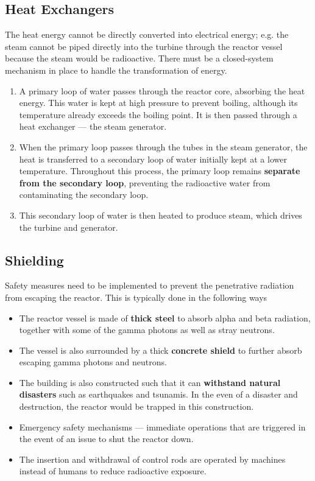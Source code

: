 \documentclass[a4paper,12pt]{article}
\begin{document}
\subsection{Heat Exchangers}

The heat energy cannot be directly converted into electrical energy; e.g. the steam cannot be piped directly into the turbine through the reactor vessel because the steam would be radioactive. There must be a closed-system mechanism in place to handle the transformation of energy.
\begin{enumerate}
  \item A primary loop of water passes through the reactor core, absorbing the heat energy. This water is kept at high pressure to prevent boiling, although its temperature already exceeds the boiling point. It is then passed through a heat exchanger --- the steam generator.
  \item When the primary loop passes through the tubes in the steam generator, the heat is transferred to a secondary loop of water initially kept at a lower temperature. Throughout this process, the primary loop remains \textbf{separate from the secondary loop}, preventing the radioactive water from contaminating the secondary loop.
  \item This secondary loop of water is then heated to produce steam, which drives the turbine and generator.
\end{enumerate}

\pagebreak

\subsection{Shielding}

Safety measures need to be implemented to prevent the penetrative radiation from escaping the reactor. This is typically done in the following ways
\begin{itemize}
  \item The reactor vessel is made of \textbf{thick steel} to absorb alpha and beta radiation, together with some of the gamma photons as well as stray neutrons.
  \item The vessel is also surrounded by a thick \textbf{concrete shield} to further absorb escaping gamma photons and neutrons.
  \item The building is also constructed such that it can \textbf{withstand natural disasters} such as earthquakes and tsunamis. In the even of a disaster and destruction, the reactor would be trapped in this construction.
  \item Emergency safety mechanisms --- immediate operations that are triggered in the event of an issue to shut the reactor down.
  \item The insertion and withdrawal of control rods are operated by machines instead of humans to reduce radioactive exposure.
\end{itemize}
\end{document}
